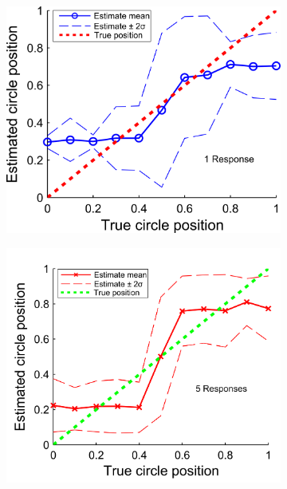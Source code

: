 \begin{figure}
	\centering
	\begin{subfigure}{7cm}
	\includegraphics[scale=1]{line_fusion_mean_1rep_LR.png}
	\caption{}	
	\label{Figure: fusion_mean_1_LR}
	\end{subfigure}
	\begin{subfigure}{7cm}
	\includegraphics[scale=1]{line_fusion_5rep_LR.png}
	\caption{}
	\label{Figure: fusion_mean_5_LR}	
	\end{subfigure}\\

\end{figure}
